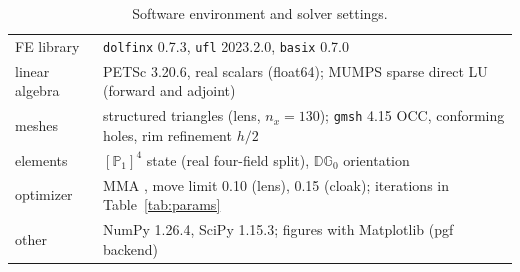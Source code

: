 \begin{table}[!tbp]
\centering\footnotesize
\caption{Software environment and solver settings.}\label{tab:env}
\begin{tabular}{@{}ll@{}}
\toprule
FE library & \texttt{dolfinx} 0.7.3, \texttt{ufl} 2023.2.0, \texttt{basix} 0.7.0\\
linear algebra & PETSc 3.20.6, real scalars (float64); MUMPS sparse direct LU (forward and adjoint)\\
meshes & structured triangles (lens, $n_x=130$); \texttt{gmsh} 4.15 OCC, conforming holes, rim refinement $h/2$\\
elements & $[\mathbb P_1]^4$ state (real four-field split), $\mathbb{DG}_0$ orientation\\
optimizer & MMA \cite{svanberg1987}, move limit 0.10 (lens), 0.15 (cloak); iterations in Table~\ref{tab:params}\\
other & NumPy 1.26.4, SciPy 1.15.3; figures with Matplotlib (pgf backend)\\
\bottomrule
\end{tabular}
\end{table}


